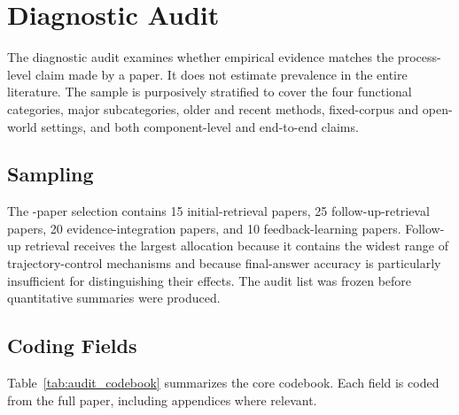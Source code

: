 \section{Diagnostic Audit}
\label{app:diagnostic_audit}

The diagnostic audit examines whether empirical evidence matches the process-level claim made by a paper. It does not estimate prevalence in the entire literature. The sample is purposively stratified to cover the four functional categories, major subcategories, older and recent methods, fixed-corpus and open-world settings, and both component-level and end-to-end claims.

\subsection{Sampling}
The \AuditSize-paper selection contains 15 initial-retrieval papers, 25 follow-up-retrieval papers, 20 evidence-integration papers, and 10 feedback-learning papers. Follow-up retrieval receives the largest allocation because it contains the widest range of trajectory-control mechanisms and because final-answer accuracy is particularly insufficient for distinguishing their effects. The audit list was frozen before quantitative summaries were produced.

\subsection{Coding Fields}
Table~\ref{tab:audit_codebook} summarizes the core codebook. Each field is coded from the full paper, including appendices where relevant.

